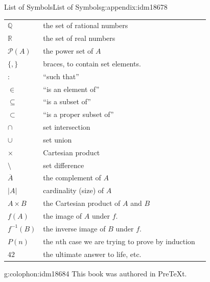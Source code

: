 \documentclass[oneside,10pt,]{book}
\numberwithin{equation}{chapter}
\def\Q{\mathbb Q}
\def\R{\mathbb R}
\def\pow{\mathcal P}
\def\inv{^{-1}}
\def\st{:}
\newcommand{\card}[1]{\left| #1 \right|}
\begin{document}
\begin{appendixptx}{List of Symbols}{}{List of Symbols}{}{}{g:appendix:idm18678}
\begin{longtable}[l]{lp{}r}
\(\Q\)&the set of rational numbers&\pageref{g:notation:idm13117}\\
\(\R\)&the set of real numbers&\pageref{g:notation:idm13128}\\
\(\pow(A)\)&the power set of \(A\)&\pageref{g:notation:idm13140}\\
\(\{, \}\)&braces, to contain set elements.&\pageref{g:notation:idm13154}\\
\(\st\)&``such that''&\pageref{g:notation:idm13165}\\
\(\in\)&``is an element of''&\pageref{g:notation:idm13176}\\
\(\subseteq\)&``is a subset of''&\pageref{g:notation:idm13197}\\
\( \subset\)&``is a proper subset of''&\pageref{g:notation:idm13212}\\
\(\cap\)&set intersection&\pageref{g:notation:idm13226}\\
\(\cup\)&set union&\pageref{g:notation:idm13241}\\
\(\times\)&Cartesian product&\pageref{g:notation:idm13257}\\
\(\setminus\)&set difference&\pageref{g:notation:idm13270}\\
\(\overline{A}\)&the complement of \(A\)&\pageref{g:notation:idm13280}\\
\(\card{A}\)&cardinality (size) of \(A\)&\pageref{g:notation:idm13291}\\
\(A\times B\)&the Cartesian product of \(A\) and \(B\)&\pageref{g:notation:idm13673}\\
\(f(A)\)&the image of \(A\) under \(f\).&\pageref{g:notation:idm14458}\\
\(f\inv(B)\)&the inverse image of \(B\) under \(f\).&\pageref{g:notation:idm14473}\\
\(P(n)\)&the \(n\)th case we are trying to prove by induction&\pageref{g:notation:idm17445}\\
\(42\)&the ultimate answer to life, etc.&\pageref{g:notation:idm17482}\\
\end{longtable}
\end{appendixptx}
%
\backmatter
%
%
\renewcommand{\leftmark}{Index}
\printindex
%
\cleardoublepage
\pagestyle{empty}
\begin{backcolophon}{g:colophon:idm18684}%
This book was authored in PreTeXt.%
\end{backcolophon}%
\end{document}
